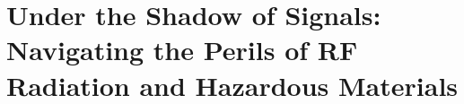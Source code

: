 \documentclass[12pt]{book}
\begin{document}
\section{Under the Shadow of Signals: Navigating the Perils of RF Radiation and Hazardous Materials}












\end{document}
